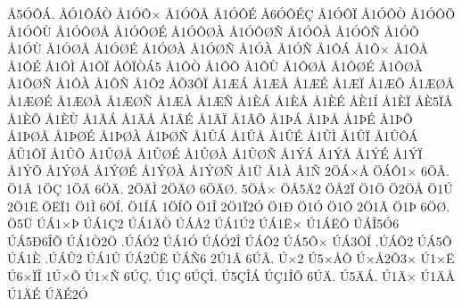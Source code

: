 {^^c55^^d3^^d4^^c1.
^^c5^^d31^^d4^^c1^^d2
^^c51^^d3^^d4^^d7
^^c51^^d3^^d4^^c5
^^c51^^d3^^d4^^c9
^^c56^^d3^^d4^^c9^^c7
^^c51^^d3^^d4^^cf
^^c51^^d3^^d4^^d2
^^c51^^d3^^d4^^d5
^^c51^^d3^^d4^^d9
^^c51^^d3^^d4^^d8^^c5
^^c51^^d3^^d4^^d8^^c9
^^c51^^d3^^d4^^d8^^c0
^^c51^^d3^^d4^^d8^^d1
^^c51^^d3^^d4^^c0
^^c51^^d3^^d4^^d1
^^c51^^d3^^d5
^^c51^^d3^^d9
^^c51^^d3^^d8^^c5
^^c51^^d3^^d8^^c9
^^c51^^d3^^d8^^c0
^^c51^^d3^^d8^^d1
^^c51^^d3^^c0
^^c51^^d3^^d1
^^c51^^d4^^c1
^^c51^^d4^^d7
^^c51^^d4^^c5
^^c51^^d4^^c9
^^c51^^d4^^cc
^^c51^^d4^^cf
^^c5^^d4^^cf^^d2^^c15
^^c51^^d4^^d2
^^c51^^d4^^d5
^^c51^^d4^^d9
^^c51^^d4^^d8^^c5
^^c51^^d4^^d8^^c9
^^c51^^d4^^d8^^c0
^^c51^^d4^^d8^^d1
^^c51^^d4^^c0
^^c51^^d4^^d1
^^c51^^d52
^^c5^^d53^^d4^^cf
^^c51^^c6^^c1
^^c51^^c6^^c5
^^c51^^c6^^c9
^^c51^^c6^^cf
^^c51^^c6^^d5
^^c51^^c6^^d8^^c5
^^c51^^c6^^d8^^c9
^^c51^^c6^^d8^^c0
^^c51^^c6^^d8^^d1
^^c51^^c6^^c0
^^c51^^c6^^d1
^^c51^^c8^^c1
^^c51^^c8^^c5
^^c51^^c8^^c9
^^c5^^c81^^cd
^^c51^^c8^^cf
^^c5^^c85^^cf^^c2
^^c51^^c8^^d5
^^c51^^c8^^d9
^^c51^^c3^^c1
^^c51^^c3^^c5
^^c51^^c3^^c9
^^c51^^c3^^cf
^^c51^^c3^^d5
^^c51^^de^^c1
^^c51^^de^^c5
^^c51^^de^^c9
^^c51^^de^^d5
^^c51^^de^^d8^^c5
^^c51^^de^^d8^^c9
^^c51^^de^^d8^^c0
^^c51^^de^^d8^^d1
^^c51^^db^^c1
^^c51^^db^^c5
^^c51^^db^^c9
^^c51^^db^^cc
^^c51^^db^^cf
^^c51^^db^^d4^^c1
^^c5^^db1^^d4^^cf
^^c51^^db^^d5
^^c51^^db^^d8^^c5
^^c51^^db^^d8^^c9
^^c51^^db^^d8^^c0
^^c51^^db^^d8^^d1
^^c51^^dd^^c1
^^c51^^dd^^c5
^^c51^^dd^^c9
^^c51^^dd^^cf
^^c51^^dd^^d5
^^c51^^dd^^d8^^c5
^^c51^^dd^^d8^^c9
^^c51^^dd^^d8^^c0
^^c51^^dd^^d8^^d1
^^c51^^dc
^^c51^^c0
^^c51^^d1
2^^d6^^c1^^d7^^c5
^^d6^^c1^^d41^^d7
6^^d6^^c2.
^^d61^^c2
1^^d6^^c7
1^^d6^^c4
6^^d6^^c4.
2^^d6^^c4^^cc
2^^d6^^c4^^d8
6^^d6^^c4^^d8.
5^^d6^^c5^^d7
^^d6^^c55^^c42
^^d6^^c52^^cf
^^d61^^d6
^^d62^^d6^^c5
^^d61^^da
2^^d61^^cb
^^d6^^cb^^cf1
^^d61^^cc
6^^d6^^cd.
^^d61^^cd^^c1
1^^d6^^cd^^d5
^^d61^^ce
2^^d61^^cf2^^d3
^^d61^^d0
^^d61^^d3
^^d61^^d4
2^^d61^^c3
^^d61^^de
6^^d6^^d8.
^^d65^^dc
^^da^^c11^^d7^^de
^^da^^c11^^c72
^^da^^c11^^c4^^d2
^^da^^c1^^c52
^^da^^c11^^da2
^^da^^c11^^cb^^d7
^^da1^^c1^^cb^^d4
^^da^^c1^^ce5^^d36
^^da^^c15^^d06^^ce^^d5
^^da^^c11^^d22^^d6
.^^da^^c1^^d32
^^da^^c11^^d3
^^da^^c1^^d32^^ce
^^da^^c1^^d42
^^da^^c15^^d4^^d7
^^da^^c13^^d4^^cd
.^^da^^c1^^d52
^^da^^c15^^d5
^^da^^c11^^c8
.^^da^^c1^^db2
^^da^^c11^^db
^^da^^c12^^db^^cb
^^da^^c1^^d16
2^^da1^^c2
6^^da^^c2.
^^da^^d72
^^da5^^d7^^c5^^d4
^^da^^d7^^c52^^d43^^d7
^^da1^^d7^^cb
^^da6^^d7^^cf^^ce
1^^da^^d7^^d5
^^da1^^d7^^d1
6^^da^^c7.
^^da1^^c7
6^^da^^c7^^cc.
^^da5^^c7^^ce^^c1
^^da^^c71^^ce^^d5
6^^da^^c4.
^^da5^^c4^^c1.
^^da1^^c4^^d7
^^da1^^c4^^c5
^^da1^^c4^^c9
^^da^^c4^^c92^^d3
}
